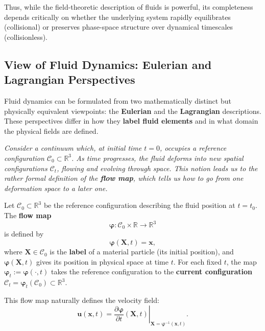Thus, while the field-theoretic description of fluids is powerful, its completeness depends critically on whether the underlying system rapidly equilibrates (collisional) or preserves phase-space structure over dynamical timescales (collisionless).

\subsection{View of Fluid Dynamics: Eulerian and Lagrangian Perspectives}

Fluid dynamics can be formulated from two mathematically distinct but physically equivalent viewpoints: the \textbf{Eulerian} and the \textbf{Lagrangian} descriptions. These perspectives differ in how they \textbf{label fluid elements} and in what domain the physical fields are defined.

\vspace{0.2cm}
\begin{center}
\textit{
Consider a continuum which, at initial time \( t = 0 \), occupies a reference configuration \( \mathcal{C}_0 \subset \mathbb{R}^3 \). As time progresses, the fluid deforms into new spatial configurations \( \mathcal{C}_t \), flowing and evolving through space. This notion leads us to the rather formal definition of the \textbf{flow map}, which tells us how to go from one deformation space to a later one.
}
\end{center}
\vspace{0.2cm}
\begin{definition}
Let \( \mathcal{C}_0 \subset \mathbb{R}^3 \) be the reference configuration describing the fluid position at $t=t_0$. The \textbf{flow map}
\[
\boldsymbol{\varphi}: \mathcal{C}_0 \times \mathbb{R} \to \mathbb{R}^3
\]
is defined by
\[
\boldsymbol{\varphi}(\mathbf{X}, t) = \mathbf{x},
\]
where \( \mathbf{X} \in \mathcal{C}_0 \) is the \textbf{label} of a material particle (its initial position), and \( \boldsymbol{\varphi}(\mathbf{X}, t) \) gives its position in physical space at time \( t \). For each fixed \( t \), the map \( \boldsymbol{\varphi}_t := \boldsymbol{\varphi}(\cdot, t) \) takes the reference configuration to the \textbf{current configuration} \( \mathcal{C}_t = \boldsymbol{\varphi}_t(\mathcal{C}_0) \subset \mathbb{R}^3 \).
\end{definition}
\vspace{0.2cm}

This flow map naturally defines the velocity field:
\[
\mathbf{u}(\mathbf{x}, t) = \left. \frac{\partial \boldsymbol{\varphi}}{\partial t}(\mathbf{X}, t) \right|_{\mathbf{X} = \boldsymbol{\varphi}^{-1}(\mathbf{x}, t)}.
\]

